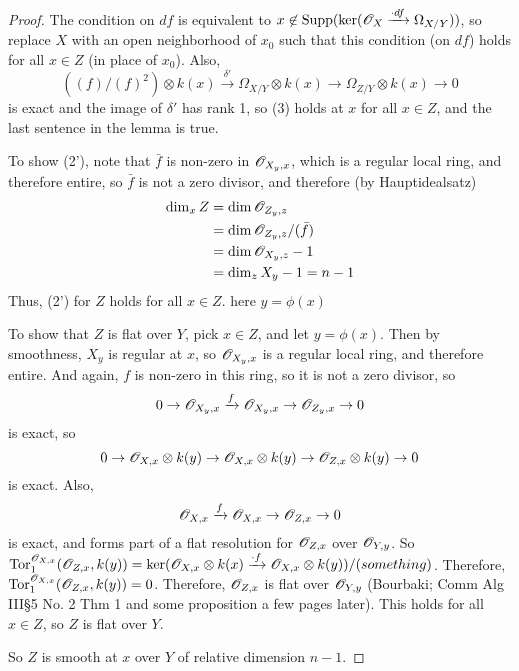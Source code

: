  \begin{proof}
 The condition on $df$ is equivalent to $x\not\in \text{\rm Supp} (\ker (\mathscr{O}_X\xrightarrow{\cdot df}
 \Omega_{X/Y}))$, so replace $X$ with an open neighborhood of $x_0$ such that this
 condition (on $df$) holds for all $x\in Z$ (in place of $x_0$).  Also,
 \[
    ((f)/(f)^2)\otimes k(x) \xrightarrow{\delta'} \Omega_{X/Y}\otimes k(x) \to \Omega_{Z/Y}\otimes k(x)
    \to 0
 \]
 is exact and the image of $\delta'$ has rank 1, so (3) holds at $x$ for all $x\in
 Z$, and the last sentence in the lemma is true.

 To show (2'), note that $\bar f$ is non-zero in $\mathscr{O}_{X_y,x}$, which is a regular
 local ring, and therefore entire, so $\bar f$ is not a zero divisor, and therefore
 (by Hauptidealsatz)
 \begin{align*}
 \dim_x Z &= \dim \mathscr{O}_{Z_y,z}\\
 &= \dim \mathscr{O}_{Z_y,z}/(\bar f) \\
 &= \dim \mathscr{O}_{X_y,z} -1\\
 & = \dim_z X_y -1 = n-1
 \end{align*}
 Thus, (2') for $Z$ holds for all $x\in Z$.  here $y=\phi(x)$

 To show that $Z$ is flat over $Y$, pick $x\in Z$, and let $y=\phi(x)$.  Then by
 smoothness, $X_y$ is regular at $x$, so $\mathscr{O}_{X_y,x}$ is a regular local ring, and
 therefore entire.  And again, $f$ is non-zero in this ring, so it is not a zero
 divisor, so
 \[
    0\to \mathscr{O}_{X_y,x} \xrightarrow{f} \mathscr{O}_{X_y,x} \to \mathscr{O}_{Z_y,x} \to 0
 \]
 is exact, so
 \[
    0\to \mathscr{O}_{X,x}\otimes k(y) \to \mathscr{O}_{X,x}\otimes k(y) \to \mathscr{O}_{Z,x}\otimes k(y) \to 0
 \]
 is exact.  Also,
 \[
    \mathscr{O}_{X,x} \xrightarrow{f} \mathscr{O}_{X,x} \to \mathscr{O}_{Z,x} \to 0
 \]
 is exact, and forms part of a flat resolution for $\mathscr{O}_{Z,x}$ over $\mathscr{O}_{Y,y}$.  So
 $\text{\rm Tor}_1^{\mathscr{O}_{X,x}}(\mathscr{O}_{Z,x},k(y)) = \ker(\mathscr{O}_{X,x}\otimes k(x) \xrightarrow{\cdot f} \mathscr{O}_{X,x}\otimes
 k(y))/(something)$.  Therefore, $\text{\rm Tor}_1^{\mathscr{O}_{X,x}}(\mathscr{O}_{Z,x},k(y))=0$.  Therefore,
 $\mathscr{O}_{Z,x}$ is flat over $\mathscr{O}_{Y,y}$ (Bourbaki; Comm Alg III\S 5 No. 2 Thm 1 and some
 proposition a few pages later).  This holds for all $x\in Z$, so $Z$ is flat over
 $Y$.

  So $Z$ is smooth at $x$ over $Y$ of relative dimension $n-1$.
 \end{proof}

